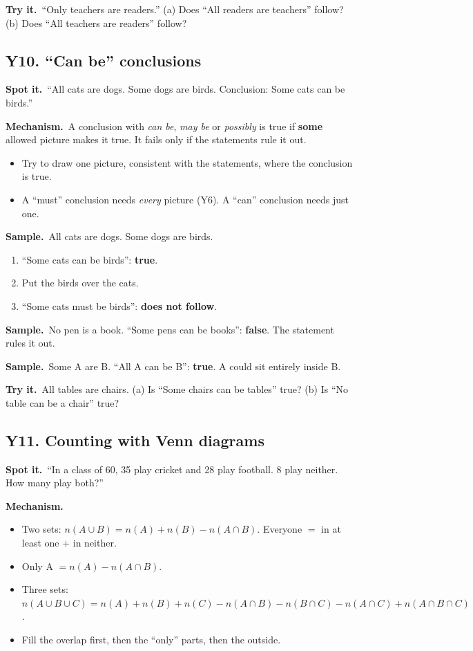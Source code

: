 \documentclass[11pt,a4paper]{article}
\let\oldsubsection\subsection
\renewcommand{\subsection}{\needspace{9\baselineskip}\oldsubsection}
\newcommand{\spot}{\textbf{\color{ember}Spot it.}\ }
\newcommand{\mech}{\textbf{\color{ember}Mechanism.}\ }
\newif\ifkeepsamp
\newcommand{\samp}{\ifkeepsamp\needspace{4\baselineskip}\fi\textbf{\color{ember}Sample.}\ }
\newcommand{\tryit}[1]{\textbf{\color{ember}Try it.}\ #1}
\begin{document}
\tryit ``Only teachers are readers.'' (a) Does ``All readers are teachers'' follow? (b) Does ``All teachers are readers'' follow?

\subsection{Y10. ``Can be'' conclusions}
\spot ``All cats are dogs. Some dogs are birds. Conclusion: Some cats can be birds.''

\mech A conclusion with \emph{can be}, \emph{may be} or \emph{possibly} is true if \textbf{some} allowed picture makes it true. It fails only if the statements rule it out.
\begin{itemize}
\item Try to draw one picture, consistent with the statements, where the conclusion is true.
\item A ``must'' conclusion needs \emph{every} picture (Y6). A ``can'' conclusion needs just one.
\end{itemize}

\samp All cats are dogs. Some dogs are birds.
\begin{enumerate}
\item ``Some cats can be birds'': \textbf{true}.
\item Put the birds over the cats.
\item ``Some cats must be birds'': \textbf{does not follow}.
\end{enumerate}
\samp No pen is a book. ``Some pens can be books'': \textbf{false}. The statement rules it out.

\samp Some A are B. ``All A can be B'': \textbf{true}. A could sit entirely inside B.

\tryit All tables are chairs. (a) Is ``Some chairs can be tables'' true? (b) Is ``No table can be a chair'' true?

\subsection{Y11. Counting with Venn diagrams}
\spot ``In a class of 60, 35 play cricket and 28 play football. 8 play neither. How many play both?''

\mech
\begin{itemize}
\item Two sets: $n(A\cup B)=n(A)+n(B)-n(A\cap B)$. Everyone $=$ in at least one $+$ in neither.
\item Only A $=n(A)-n(A\cap B)$.
\item Three sets: $n(A\cup B\cup C)=n(A)+n(B)+n(C)-n(A\cap B)-n(B\cap C)-n(A\cap C)+n(A\cap B\cap C)$.
\item Fill the overlap first, then the ``only'' parts, then the outside.
\end{itemize}
\end{document}
